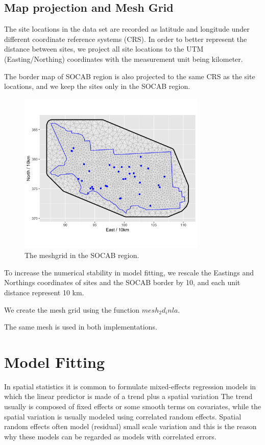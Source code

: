 \subsection{Map projection and Mesh Grid}
The site locations in the data set are recorded as latitude and longitude under different coordinate
reference systems (CRS). In order to better represent the distance between sites, we project all 
site locations to the UTM (Easting/Northing) coordinates with the measurement unit being kilometer.

The border map of SOCAB region is also projected to the same CRS as the site locations, and we keep
the sites only in the SOCAB region. 

\begin{figure}[ht]
	\centering
	\includegraphics[width = 0.8\textwidth]{socab_plots/SOCAB_meshgrid.png}
	\caption{The meshgrid in the SOCAB region.}
	\label{fig:socab_meshgrid}
\end{figure}

To increase the numerical stability in model fitting, we rescale the Eastings and Northings 
coordinates of sites and the SOCAB border by 10, and each unit distance represent 10 km.

We create the mesh grid using the function $mesh_2d_inla$. 

The same mesh is used in both implementations. 


\section{Model Fitting}
In spatial statistics it is common to formulate mixed-effects regression models in which the linear predictor is made of a trend plus a spatial variation
The trend usually is composed of fixed effects or some smooth terms on covariates, while the spatial variation is usually modeled using correlated random effects.
Spatial random effects often model (residual) small scale variation and this is the reason why these models can be regarded as models with correlated errors.

